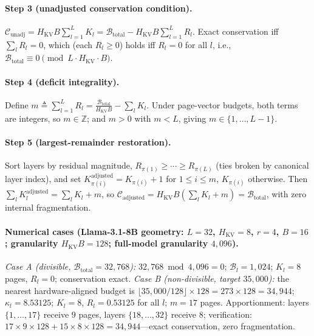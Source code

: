 \documentclass[final,5p,times,twocolumn]{elsarticle}
\theoremstyle{definition}
\theoremstyle{remark}
\newcommand{\HKV}{H_{\mathrm{KV}}}
\begin{document}
\paragraph{Step 3 (unadjusted conservation condition).}
 $\mathcal{C}_{\mathrm{unadj}} = \HKV B \sum_{l=1}^{L} K_l
= \mathcal{B}_{\mathrm{total}} - \HKV B\sum_{l=1}^{L} R_l$. Exact
conservation iff $\sum_l R_l = 0$, which (each $R_l \ge 0$) holds iff
 $R_l = 0$ for all $l$, i.e.,
 $\mathcal{B}_{\mathrm{total}} \equiv 0 \pmod{L\cdot\HKV\cdot B}$.

\paragraph{Step 4 (deficit integrality).}
Define $m \triangleq \sum_{l=1}^{L} R_l =
\frac{\mathcal{B}_{\mathrm{total}}}{\HKV B} - \sum_l K_l$. Under
page-vector budgets, both terms are integers, so $m \in \mathbb{Z}$;
and $m > 0$ with $m < L$, giving $m \in \{1,\dots,L-1\}$.

\paragraph{Step 5 (largest-remainder restoration).}
Sort layers by residual magnitude, $R_{\pi(1)} \ge \cdots \ge
R_{\pi(L)}$ (ties broken by canonical layer index), and set
 $K^{\mathrm{adjusted}}_{\pi(i)} = K_{\pi(i)} + 1$ for $1 \le i \le m$,
 $K_{\pi(i)}$ otherwise. Then $\sum_l K^{\mathrm{adjusted}}_l = \sum_l
K_l + m$, so $\mathcal{C}_{\mathrm{adjusted}} = \HKV B(\sum_l K_l + m)
= \mathcal{B}_{\mathrm{total}}$, with zero internal fragmentation.

\paragraph{Numerical cases (Llama-3.1-8B geometry: $L{=}32$,
 $\HKV{=}8$, $r{=}4$, $B{=}16$; granularity $\HKV B = 128$; full-model
 granularity $4{,}096$).}
\emph{Case A (divisible, $\mathcal{B}_{\mathrm{total}} = 32{,}768$):}
 $32{,}768 \bmod 4{,}096 = 0$; $\mathcal{B}_l = 1{,}024$;
 $K_l = 8$ pages, $R_l = 0$; conservation exact.
\emph{Case B (non-divisible, target $35{,}000$):} the nearest
hardware-aligned budget is $\lfloor 35{,}000/128\rfloor \times 128 =
273\times 128 = 34{,}944$; $\kappa_l = 8.53125$; $K_l = 8$,
 $R_l = 0.53125$ for all $l$; $m = 17$ pages. Apportionment: layers
 $\{1,\dots,17\}$ receive $9$ pages, layers $\{18,\dots,32\}$ receive
 $8$; verification: $17\times 9\times 128 + 15\times 8\times 128 =
34{,}944$---exact conservation, zero fragmentation.
\end{document}
